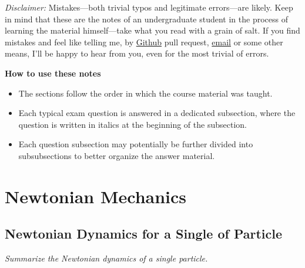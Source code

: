 \documentclass[11pt, a4paper]{article}
\begin{document}
\vspace{2mm}
\textit{Disclaimer:} Mistakes---both trivial typos and legitimate errors---are likely. Keep in mind that these are the notes of an undergraduate student in the process of learning the material himself---take what you read with a grain of salt. If you find mistakes and feel like telling me, by \href{https://github.com/ejmastnak/fmf}{Github} pull request, \href{mailto:ejmastnak@gmail.com}{email} or some other means, I'll be happy to hear from you, even for the most trivial of errors.


\vspace{5mm}
\textbf{How to use these notes}
\begin{itemize}
    \item The sections follow the order in which the course material was taught.

    \item Each typical exam question is answered in a dedicated subsection, where the question is written in italics at the beginning of the subsection.
    
    \item Each question subsection may potentially be further divided into subsubsections to better organize the answer material.


\end{itemize}

\newpage

\tableofcontents

\newpage

\pagestyle{headerstyle}
\section{Newtonian Mechanics}

\subsection{Newtonian Dynamics for a Single of Particle}
\textit{Summarize the Newtonian dynamics of a single particle.}
\end{document}
